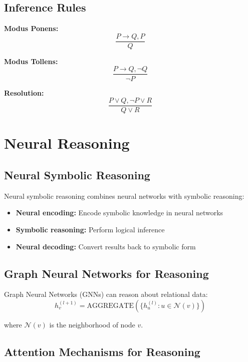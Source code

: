 \subsection{Inference Rules}

\textbf{Modus Ponens:}
\begin{equation}
    \frac{P \rightarrow Q, P}{Q}
\end{equation}

\textbf{Modus Tollens:}
\begin{equation}
    \frac{P \rightarrow Q, \neg Q}{\neg P}
\end{equation}

\textbf{Resolution:}
\begin{equation}
    \frac{P \lor Q, \neg P \lor R}{Q \lor R}
\end{equation}

\section{Neural Reasoning}

\subsection{Neural Symbolic Reasoning}

Neural symbolic reasoning combines neural networks with symbolic reasoning:
\begin{itemize}
    \item \textbf{Neural encoding:} Encode symbolic knowledge in neural networks
    \item \textbf{Symbolic reasoning:} Perform logical inference
    \item \textbf{Neural decoding:} Convert results back to symbolic form
\end{itemize}

\subsection{Graph Neural Networks for Reasoning}

Graph Neural Networks (GNNs) can reason about relational data:
\begin{equation}
    h_v^{(l+1)} = \text{AGGREGATE}(\{h_u^{(l)} : u \in \mathcal{N}(v)\})
\end{equation}

where $\mathcal{N}(v)$ is the neighborhood of node $v$.

\subsection{Attention Mechanisms for Reasoning}

